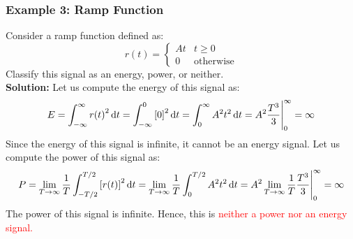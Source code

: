 \documentclass[../notes-main.tex]{subfiles}
\begin{document}
\subsubsection{Example 3: Ramp Function}
Consider a ramp function defined as:
\begin{equation}
    r(t) =
    \begin{cases}
        At & t \geq 0         \\
        0  & \text{otherwise}
    \end{cases}
    \label{eq:ramp-function-example}
\end{equation}
Classify this signal as an energy, power, or neither.\\
\noindent \textbf{Solution:} Let us compute the energy of this signal as:
\begin{equation}
    E = \int_{-\infty}^{\infty} {r(t)}^2 \dif t = \int_{-\infty}^{0} {[0]}^2 \dif t = \int_{0}^{\infty} A^2 t^2 \dif t = A^2 \frac{T^3}{3} \Bigg|_{0}^{\infty} = \infty
    \label{eq:ramp-function-energy}
\end{equation}
Since the energy of this signal is infinite, it cannot be an energy signal. Let us compute the power of this signal as:
\begin{equation}
    P = \lim_{T \to \infty} \frac{1}{T} \int_{-T/2}^{T/2} {[r(t)]}^2 \dif t = \lim_{T \to \infty} \frac{1}{T} \int_{0}^{T/2} A^2 t^2 \dif t = A^2 \lim_{T \to \infty} \frac{1}{T} \frac{T^3}{3} \Bigg|_{0}^{\infty} = \infty
    \label{eq:ramp-function-power}
\end{equation}
The power of this signal is infinite. Hence, this is \textcolor{red}{neither a power nor an energy signal.}
\end{document}
